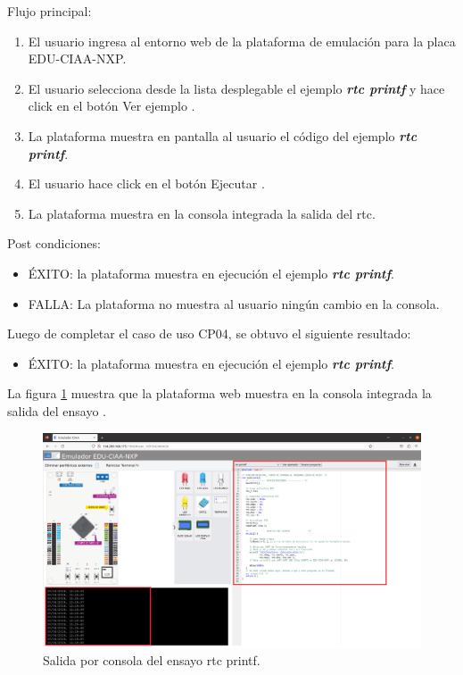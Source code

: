 Flujo principal:
\begin{enumerate}
	\item El usuario ingresa al entorno web de la plataforma de emulación para la placa EDU-CIAA-NXP.
	\item El usuario selecciona desde la lista desplegable el ejemplo \textit{\textbf{rtc printf}} y hace click en el botón \textquotedbl Ver ejemplo \textquotedbl.
	\item La plataforma muestra en pantalla al usuario el código del ejemplo \textit{\textbf{rtc printf}}.
	\item El usuario hace click en el botón \textquotedbl Ejecutar \textquotedbl.
	\item La plataforma muestra en la consola integrada la salida del rtc.
\end{enumerate}


Post condiciones:
\begin{itemize}
	\item ÉXITO: la plataforma muestra en ejecución el ejemplo \textit{\textbf{rtc printf}}.
	\item FALLA: La plataforma no muestra al usuario ningún cambio en la consola.
\end{itemize}



Luego de completar el caso de uso CP04, se obtuvo el siguiente resultado: 

\begin{itemize}
	\item ÉXITO: la plataforma muestra en ejecución el ejemplo \textit{\textbf{rtc printf}}.
\end{itemize}


La figura \ref{fig:rtcprintf} muestra que la plataforma web muestra en la consola integrada la salida del ensayo . 

\begin{figure}[ht]
	\centering
	\includegraphics[scale=.28]{./Figures/rtcprintf.png}
	\caption{Salida por consola del ensayo rtc printf.}
	\label{fig:rtcprintf}
\end{figure}

